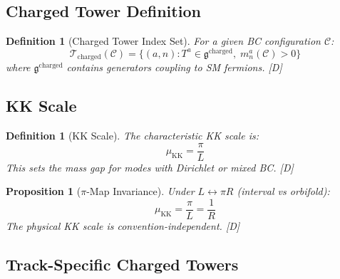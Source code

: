 \documentclass[11pt,a4paper]{article}
\newtheorem{proposition}[theorem]{Proposition}
\newtheorem{definition}[theorem]{Definition}
\newcommand{\tagD}{\textcolor{blue!70!black}{[D]}}
\begin{document}
\subsection{Charged Tower Definition}

\begin{definition}[Charged Tower Index Set]
\label{def:charged-tower}
For a given BC configuration $\mathcal{C}$:
\begin{equation}
\label{eq:charged-tower}
\mathcal{T}_{\text{charged}}(\mathcal{C}) = \{(a, n) : T^a \in \mathfrak{g}^{\text{charged}},\;
m_n^a(\mathcal{C}) > 0\}
\end{equation}
where $\mathfrak{g}^{\text{charged}}$ contains generators coupling to SM fermions. \tagD
\end{definition}

\subsection{KK Scale}

\begin{definition}[KK Scale]
\label{def:kk-scale}
The characteristic KK scale is:
\begin{equation}
\label{eq:kk-scale}
\mu_{\text{KK}} = \frac{\pi}{L}
\end{equation}
This sets the mass gap for modes with Dirichlet or mixed BC. \tagD
\end{definition}

\begin{proposition}[$\pi$-Map Invariance]
\label{prop:pi-map}
Under $L \leftrightarrow \pi R$ (interval vs orbifold):
\begin{equation}
\label{eq:pi-map-kk}
\mu_{\text{KK}} = \frac{\pi}{L} = \frac{1}{R}
\end{equation}
The physical KK scale is convention-independent. \tagD
\end{proposition}

\subsection{Track-Specific Charged Towers}
\end{document}
